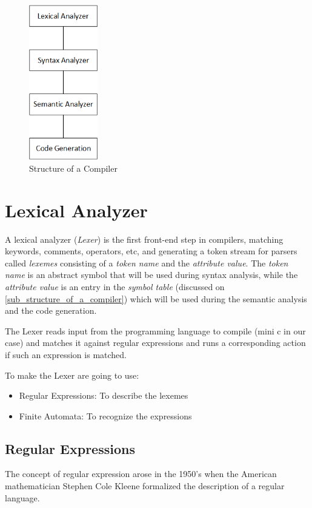 \documentclass[conference]{IEEEtran}
\theoremstyle{definition}
\begin{document}
\begin{figure}[H]
\centering
\includegraphics[width=3cm]{images/Diagram.png}
\caption{Structure of a Compiler}
\label{fig_struct_of_compilator}
\end{figure}

\section{Lexical Analyzer} \label{sec:lexical-Analizer}
A lexical analyzer (\textit{Lexer}) is the first front-end step in compilers, matching keywords, comments, operators, etc, and generating a token stream for parsers called \textit{lexemes} consisting of a \textit{token name} and the \textit{attribute value}.
The \textit{token name} is an abstract symbol that will be used during syntax analysis, while the \textit{attribute value} is an entry in the \textit{symbol table} (discussed on \ref{sub_structure_of_a_compiler}) which will be used during the semantic analysis and the code generation.

The Lexer reads input from the programming language to compile (mini c in our case) and matches it against regular expressions and runs a corresponding action if such an expression is matched.

To make the Lexer are going to use:
\begin{itemize}
	\item Regular Expressions: To describe the lexemes
	\item Finite Automata: To recognize the expressions
\end{itemize}
\subsection{Regular Expressions}
The concept of regular expression arose in the 1950's when the American mathematician Stephen Cole Kleene formalized the description of a regular language.
\end{document}
